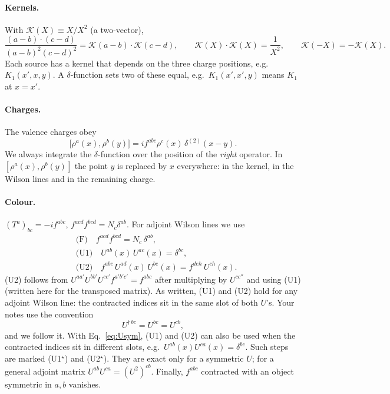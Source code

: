 \documentclass[10pt]{article}
\numberwithin{equation}{section}
\newcommand{\KK}{\mathcal K}
\begin{document}
\paragraph{Kernels.} With $\KK(X)\equiv X/X^2$ (a two-vector),
\begin{equation}
\frac{(a-b)\cdot(c-d)}{(a-b)^2(c-d)^2}=\KK(a-b)\cdot\KK(c-d),\qquad \KK(X)\cdot\KK(X)=\frac{1}{X^2},\qquad \KK(-X)=-\KK(X).
\end{equation}
Each source has a kernel that depends on the three charge positions, e.g.\ $K_1(x',x,y)$. A $\delta$-function sets two of these equal, e.g.\ $K_1(x',x',y)$ means $K_1$ at $x=x'$.

\paragraph{Charges.} The valence charges obey
\begin{equation}
\big[\rho^a(x),\rho^b(y)\big]=if^{abc}\rho^c(x)\,\delta^{(2)}(x-y).
\label{eq:comm}
\end{equation}
We always integrate the $\delta$-function over the position of the \emph{right} operator. In $[\rho^a(x),\rho^b(y)]$ the point $y$ is replaced by $x$ everywhere: in the kernel, in the Wilson lines and in the remaining charge.

\paragraph{Colour.} $(T^a)_{bc}=-if^{abc}$, $f^{acd}f^{bcd}=N_c\delta^{ab}$. For adjoint Wilson lines we use
\begin{align}
&\text{(F)}\quad f^{acd}f^{bcd}=N_c\,\delta^{ab},\\
&\text{(U1)}\quad U^{ab}(x)\,U^{ac}(x)=\delta^{bc},\label{eq:U1}\\
&\text{(U2)}\quad f^{abc}\,U^{ad}(x)\,U^{be}(x)=f^{deh}\,U^{ch}(x).\label{eq:U2}
\end{align}
(U2) follows from $U^{aa'}U^{bb'}U^{cc'}f^{a'b'c'}=f^{abc}$ after multiplying by $U^{cc''}$ and using (U1) (written here for the transposed matrix). As written, (U1) and (U2) hold for any adjoint Wilson line: the contracted indices sit in the same slot of both $U$'s. Your notes use the convention
\begin{equation}
U^{\dagger\,bc}=U^{bc}=U^{cb},
\label{eq:Usym}
\end{equation}
and we follow it. With Eq.~\eqref{eq:Usym}, (U1) and (U2) can also be used when the contracted indices sit in different slots, e.g.\ $U^{ab}(x)U^{ca}(x)=\delta^{bc}$. Such steps are marked (U1$^\star$) and (U2$^\star$). They are exact only for a symmetric $U$; for a general adjoint matrix $U^{ab}U^{ca}=(U^2)^{cb}$. Finally, $f^{abc}$ contracted with an object symmetric in $a,b$ vanishes.
\end{document}
